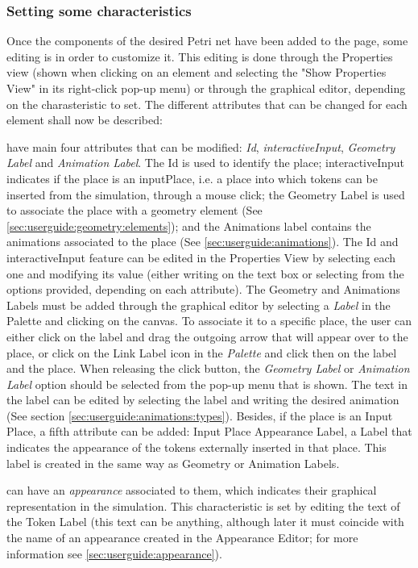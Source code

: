 \subsubsection{Setting some characteristics}
\label{sec:userguide:petrinet:setup}
Once the components of the desired Petri net have been added to the page, some editing is in order
to customize it. This editing is done through the Properties view (shown when clicking on an element
and selecting the "Show Properties View" in its right-click pop-up menu) or through the graphical
editor, depending on the charasteristic to set. The different attributes that can be changed for
each element shall now be described:
  
\begin{description}
\label{sec:userguide:petrinet:setup:places}
  \item[Places] have main four attributes that can be modified: \textit{Id},
  \textit{interactiveInput}, \textit{Geometry Label} and \textit{Animation Label}. The Id is used to
  identify the place; interactiveInput indicates if the place is an inputPlace, 
  i.e. a place into which tokens can be inserted from the simulation, through a mouse click; the
  Geometry Label is used to associate the place with a geometry element (See
  \ref{sec:userguide:geometry:elements}); and the Animations label contains the animations
  associated to the place (See \ref{sec:userguide:animations}). The Id and interactiveInput feature
  can be edited in the Properties View by selecting each one and modifying its value (either writing
  on the text box or selecting from the options provided, depending on each attribute). The Geometry
  and Animations Labels must be added through the graphical editor by selecting a \textit{Label} in
  the Palette and clicking on the canvas. To associate it to a specific place, the user can either
  click on the label and drag the outgoing arrow that will appear over to the place, or click on the
  Link Label icon in the \textit{Palette} and click then on the label and the place. When releasing
  the click button, the \textit{Geometry Label} or \textit{Animation Label} option should be
  selected from the pop-up menu that is shown. The text in the label can be edited by selecting the
  label and writing the desired animation (See section \ref{sec:userguide:animations:types}).
  Besides, if the place is an Input Place, a fifth attribute can be added: Input Place Appearance
  Label, a Label that indicates the appearance of the tokens externally inserted in that place. This
  label is created in the same way as Geometry or Animation Labels.
 \item[Tokens in Places] can have an \textit{appearance} associated to them, which indicates their
 graphical representation in the simulation. This characteristic is set by editing the text of the
 Token Label (this text can be anything, although later it must coincide with the name of an
 appearance created in the Appearance Editor; for more information see
 \ref{sec:userguide:appearance}).
 

\end{description}
